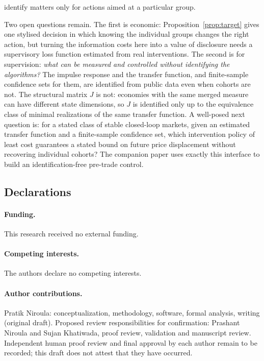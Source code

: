 identify matters only for actions aimed at a particular group.

Two open questions remain. The first is economic: Proposition~\ref{prop:target} gives one stylised decision in which knowing the individual groups changes the right action, but turning the information costs here into a value of disclosure needs a supervisory loss function estimated from real interventions. The second is for supervision: \emph{what can be measured and controlled without identifying the algorithms?} The impulse response and the transfer function, and finite-sample confidence sets for them, are identified from public data even when cohorts are not. The structural matrix $J$ is not: economies with the same merged measure can have different state dimensions, so $J$ is identified only up to the equivalence class of minimal realizations of the same transfer function. A well-posed next question is: for a stated class of stable closed-loop markets, given an estimated transfer function and a finite-sample confidence set, which intervention policy of least cost guarantees a stated bound on future price displacement without recovering individual cohorts? The companion paper uses exactly this interface to build an identification-free pre-trade control.

\subsection*{Declarations}

\paragraph{Funding.} This research received no external funding.

\paragraph{Competing interests.} The authors declare no competing interests.

\paragraph{Author contributions.} Pratik Niroula: conceptualization, methodology, software, formal analysis, writing (original draft). Proposed review responsibilities for confirmation: Prashant Niroula and Sujan Khatiwada, proof review, validation and manuscript review. Independent human proof review and final approval by each author remain to be recorded; this draft does not attest that they have occurred.

